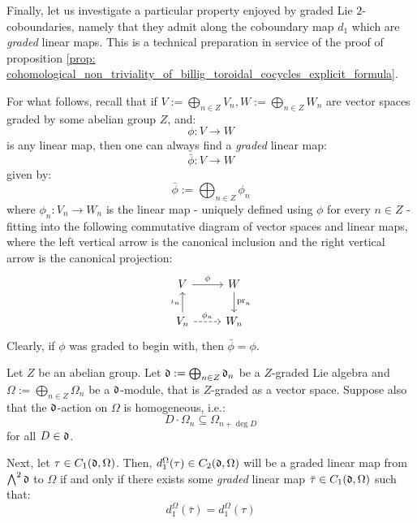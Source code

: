         Finally, let us investigate a particular property enjoyed by graded Lie $2$-coboundaries, namely that they admit  along the coboundary map $d_1$ which are \textit{graded} linear maps. This is a technical preparation in service of the proof of proposition \ref{prop: cohomological_non_triviality_of_billig_toroidal_cocycles_explicit_formula}.
        \begin{remark} \label{remark: grading_projections}
            For what follows, recall that if $V := \bigoplus_{n \in Z} V_n, W := \bigoplus_{n \in Z} W_n$ are vector spaces graded by some abelian group $Z$, and:
                $$\phi: V \to W$$
            is any linear map, then one can always find a \textit{graded} linear map:
                $$\bar{\phi}: V \to W$$
            given by:
                $$\bar{\phi} := \bigoplus_{n \in Z} \phi_n$$
            where $\phi_n: V_n \to W_n$ is the linear map - uniquely defined using $\phi$ for every $n \in Z$ - fitting into the following commutative diagram of vector spaces and linear maps, where the left vertical arrow is the canonical inclusion and the right vertical arrow is the canonical projection:
                $$
                    \begin{tikzcd}
                	V & W \\
                	{V_n} & {W_n}
                	\arrow["{\pr_n}", from=1-2, to=2-2]
                	\arrow["{\iota_n}", from=2-1, to=1-1]
                	\arrow["\phi_n", dashed, from=2-1, to=2-2]
                	\arrow["\phi", from=1-1, to=1-2]
                    \end{tikzcd}
                $$
            Clearly, if $\phi$ was graded to begin with, then $\bar{\phi} = \phi$.
        \end{remark}
        \begin{lemma} \label{lemma: graded_2_coboundaries}
            Let $Z$ be an abelian group. Let $\mathfrak{d} := \bigoplus_{n \in Z} \mathfrak{d}_n$ be a $Z$-graded Lie algebra and $\Omega := \bigoplus_{n \in Z} \Omega_n$ be a $\mathfrak{d}$-module, that is $Z$-graded as a vector space. Suppose also that the $\mathfrak{d}$-action on $\Omega$ is homogeneous, i.e.:
                $$D \cdot \Omega_n \subseteq \Omega_{n + \deg D}$$
            for all $D \in \mathfrak{d}$. 

            Next, let $\tau \in C_1(\mathfrak{d}, \Omega)$. Then, $d_1^{\Omega}(\tau) \in C_2(\mathfrak{d}, \Omega)$ will be a graded linear map from $\bigwedge^2 \mathfrak{d}$ to $\Omega$ if and only if there exists some \textit{graded} linear map $\bar{\tau} \in C_1(\mathfrak{d}, \Omega)$ such that:
                $$d_1^{\Omega}(\bar{\tau}) = d_1^{\Omega}(\tau)$$
        \end{lemma}
